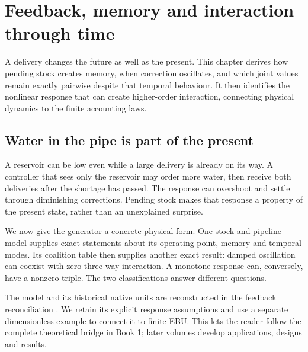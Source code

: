 \chapter{Feedback, memory and interaction through time}\label{ch:generator-orders}

A delivery changes the future as well as the present. This chapter derives how pending stock creates memory, when correction oscillates, and which joint values remain exactly pairwise despite that temporal behaviour. It then identifies the nonlinear response that can create higher-order interaction, connecting physical dynamics to the finite accounting laws.

\section{Water in the pipe is part of the present}
A reservoir can be low even while a large delivery is already on its way. A controller that sees only the reservoir may order more water, then receive both deliveries after the shortage has passed. The response can overshoot and settle through diminishing corrections. Pending stock makes that response a property of the present state, rather than an unexplained surprise.

We now give the generator a concrete physical form. One stock-and-pipeline model supplies exact statements about its operating point, memory and temporal modes. Its coalition table then supplies another exact result: damped oscillation can coexist with zero three-way interaction. A monotone response can, conversely, have a nonzero triple. The two classifications answer different questions.

The model and its historical native units are reconstructed in the feedback reconciliation \cite{feedback-report}. We retain its explicit response assumptions and use a separate dimensionless example to connect it to finite EBU. This lets the reader follow the complete theoretical bridge in Book 1; later volumes develop applications, designs and results.

